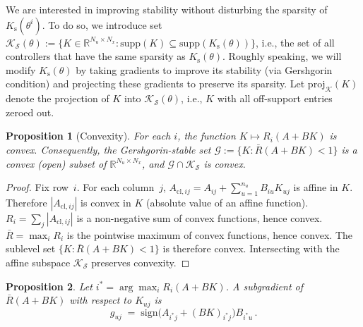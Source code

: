 \documentclass[letterpaper, 10pt, conference]{ieeeconf}
\newtheorem{proposition}{Proposition}
\begin{document}
We are interested in improving stability without disturbing the sparsity of $K_\mathrm{s}(\theta^i)$. To do so, we introduce set $\mathcal{K}_{\mathcal{S}}(\theta) := \{K\in\mathbb{R}^{N_u\times N_x}:
\mathrm{supp}(K)\subseteq \mathrm{supp}(K_\mathrm{s}(\theta)) \}$, i.e., the set of all controllers that have the same sparsity as $K_\mathrm{s}(\theta)$.
Roughly speaking, we will modify $K_\mathrm{s}(\theta)$ by taking gradients to improve its stability (via Gershgorin condition) and projecting these gradients to preserve its sparsity. Let $\mathrm{proj}_\mathcal{K}(K)$ denote the projection of $K$ into $\mathcal{K}_{\mathcal{S}}(\theta)$, i.e., $K$ with all off-support entries zeroed out.

\begin{proposition}[Convexity]\label{prop:convex}
For each $i$, the function $K\mapsto R_i(A+BK)$ is convex.
Consequently, the Gershgorin-stable set
$\mathcal{G} := \{K:\bar{R}(A+BK)<1\}$ is a convex (open) subset
of\/ $\mathbb{R}^{N_u\times N_x}$, and
$\mathcal{G}\cap\mathcal{K}_{\mathcal{S}}$ is convex.
\end{proposition}
\begin{proof}
Fix row~$i$.  For each column~$j$,
$A_{\mathrm{cl},ij}=A_{ij}+\sum_{u=1}^{n_u}B_{iu}K_{uj}$ is affine
in $K$.  Therefore $|A_{\mathrm{cl},ij}|$ is convex in $K$ (absolute
value of an affine function).  $R_i=\sum_j|A_{\mathrm{cl},ij}|$ is a
non-negative sum of convex functions, hence convex.
$\bar{R}=\max_i R_i$ is the pointwise maximum of convex functions,
hence convex.  The sublevel set $\{K:\bar{R}(A+BK)<1\}$ is therefore
convex.  
Intersecting with the affine subspace
$\mathcal{K}_{\mathcal{S}}$ preserves convexity.
\end{proof}


\begin{proposition}\label{prop:subgrad}
Let $i^*=\arg\max_i R_i(A+BK)$.  A subgradient of\/ $\bar{R}(A+BK)$ with respect to
$K_{uj}$ is
\begin{equation}\label{eq:subgrad}
  g_{uj} \;=\; \mathrm{sign}\!\bigl(A_{i^*j} + (BK)_{i^*j}\bigr)
               B_{i^*u}\,.
\end{equation}
\end{proposition}
\end{document}
